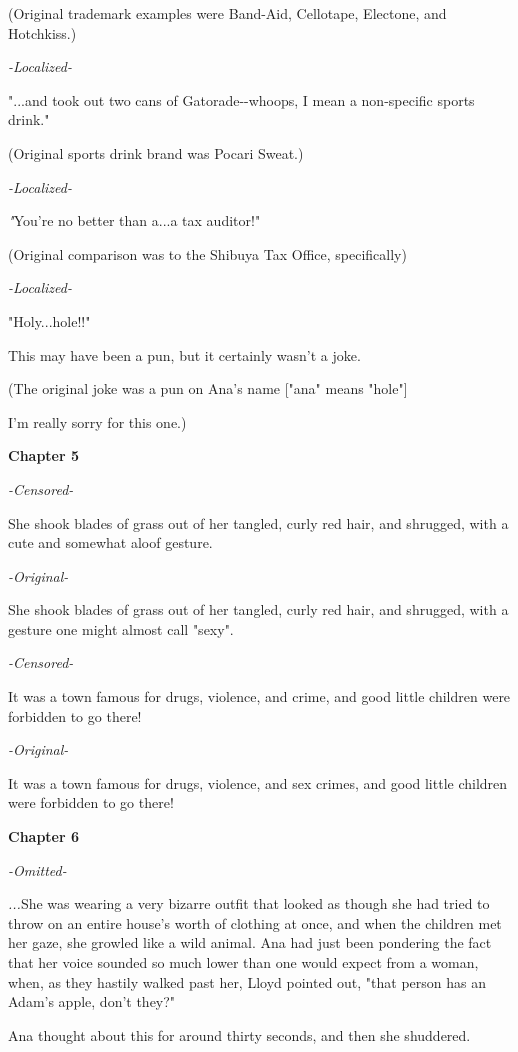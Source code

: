 \documentclass[
]{article}
\begin{document}
(Original trademark examples were Band-Aid, Cellotape, Electone, and
Hotchkiss.)

\emph{-Localized-}

"...and took out two cans of Gatorade-\/-whoops, I mean a non-specific
sports drink."

(Original sports drink brand was Pocari Sweat.)

\emph{-Localized-}

\emph{"}You're no better than a...a tax auditor!"

(Original comparison was to the Shibuya Tax Office, specifically)

\emph{-Localized-}

"Holy...hole!!"

This may have been a pun, but it certainly wasn't a joke.

(The original joke was a pun on Ana's name {[}"ana" means "hole"{]}

I'm really sorry for this one.)

\textbf{Chapter 5}

\emph{-Censored-}

She shook blades of grass out of her tangled, curly red hair, and
shrugged, with a cute and somewhat aloof gesture.

\emph{-Original-}

She shook blades of grass out of her tangled, curly red hair, and
shrugged, with a gesture one might almost call "sexy".

\emph{-Censored-}

It was a town famous for drugs, violence, and crime, and good little
children were forbidden to go there!

\emph{-Original-}

It was a town famous for drugs, violence, and sex crimes, and good
little children were forbidden to go there!

\textbf{Chapter 6}

\emph{-Omitted-}

\emph{...}She was wearing a very bizarre outfit that looked as though
she had tried to throw on an entire house's worth of clothing at once,
and when the children met her gaze, she growled like a wild animal. Ana
had just been pondering the fact that her voice sounded so much lower
than one would expect from a woman, when, as they hastily walked past
her, Lloyd pointed out, "that person has an Adam's apple, don't they?"

Ana thought about this for around thirty seconds, and then she
shuddered.
\end{document}
